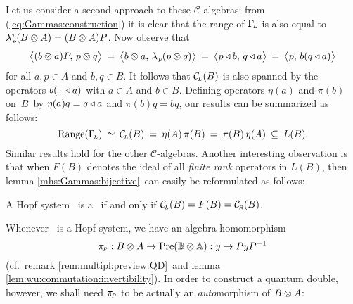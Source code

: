 Let us consider a second approach to these $\mathcal{C}$-algebras:
from (\ref{eq:Gammas:construction}) it is clear that the range of $\Gamma_{\!\scriptscriptstyle L}$ is
also equal to $\lambda_{_P\!}^\tau(B\otimes A)=(B\otimes A)P$.
Now observe that
$$ \pairM{(b\tens a)P}{p\tens q}
   \:=\: \pairM{b\tens a}{\lp(p\tens q)}
   \:=\: \pairM{p \ract b}{q \ract a}
   \:=\: \pairM{p}{b(q \ract a)}   $$
for all $a,p\in A$ and $b,q\in B$.
It follows that $\mathcal{C}_{\scriptscriptstyle \! L}(B)$ is also spanned by the operators
$b(\,\cdot\, \triangleleft a)$ with $a\in A$ and $b\in B$.
Defining operators $\eta(a)$ and $\pi(b)$ \mbox{on $B$}\ by
$\eta(a)q=q \triangleleft a$ and $\pi(b)q = bq$, our results can be summarized as follows:
$$ \mbox{\rm Range}(\Gamma_{\!\scriptscriptstyle L})  \:\simeq\:  \mathcal{C}_{\scriptscriptstyle \! L}(B)  \:=\: \eta(A)\,\pi(B)  \:=\: \pi(B)\,\eta(A)
          \:\subseteq\:  L(B).$$
Similar results hold for the other $\mathcal{C}$-algebras.
Another interesting observation is that when
$F(B)$ denotes the ideal of all {\em finite rank\/} operators in $L(B)$,
then lemma \ref{mhs:Gammas:bijective}\ can easily be reformulated as follows:
\begin{lemma}
A Hopf system\/ \pairAB\ is a \mhs\ if and only if\/
$\mathcal{C}_{\scriptscriptstyle \! L}(B) = F(B) = \mathcal{C}_{\scriptscriptstyle \! R}(B)$.
\end{lemma}



Whenever \pairAB\ is a Hopf system, we have an algebra homomorphism
$$ \pi_{\scriptscriptstyle \! P} : B \otimes A \rightarrow \mbox{\rm Pre}(\mathbb{B} \otimes \mathbb{A}): y \mapsto P y P^{-1} $$
(cf.\ remark \ref{rem:multipl:preview:QD}\ and
lemma \ref{lem:wu:commutation:invertibility}).
In order to construct a quantum double, however, we shall need $\pi_{\scriptscriptstyle \! P}$
to be actually an {\em auto\/}morphism of $B\otimes A$:


